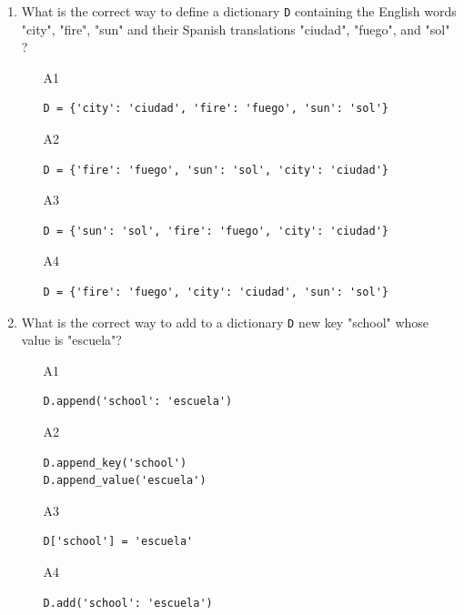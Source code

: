 \begin{enumerate}
\begin{enumerate}
\begin{verbatim}
[('1', 'John'), ('2', 'Jerry'), ('3', 'Jed')]
\end{verbatim}
\item[A4] 
\begin{verbatim}
[('John', '1'), ('Jerry', '2'), ('Jed', '3')]
\end{verbatim}
\end{enumerate}
\item What is the correct way to define a dictionary {\tt D} containing the 
      English words "city", "fire", "sun" and their Spanish translations "ciudad",
      "fuego", and "sol" ?
\begin{enumerate}
\item[A1] 
\begin{verbatim}
D = {'city': 'ciudad', 'fire': 'fuego', 'sun': 'sol'}
\end{verbatim}
\item[A2] 
\begin{verbatim}
D = {'fire': 'fuego', 'sun': 'sol', 'city': 'ciudad'}
\end{verbatim}
\item[A3] 
\begin{verbatim}
D = {'sun': 'sol', 'fire': 'fuego', 'city': 'ciudad'}
\end{verbatim}
\item[A4] 
\begin{verbatim}
D = {'fire': 'fuego', 'city': 'ciudad', 'sun': 'sol'}
\end{verbatim}
\end{enumerate}
\item What is the correct way to add to a dictionary {\tt D} new key 
"school" whose value is "escuela"? 
\begin{enumerate}
\item[A1] 
\begin{verbatim}
D.append('school': 'escuela')
\end{verbatim}
\item[A2] 
\begin{verbatim}
D.append_key('school')
D.append_value('escuela')
\end{verbatim}
\item[A3] 
\begin{verbatim}
D['school'] = 'escuela'
\end{verbatim}
\item[A4] 
\begin{verbatim}
D.add('school': 'escuela')
\end{verbatim}

\end{enumerate}
\end{enumerate}
